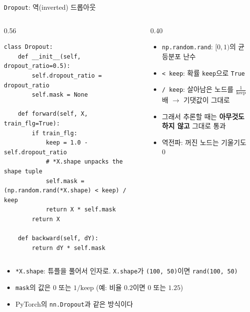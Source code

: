 \documentclass[aspectratio=169,11pt]{beamer}
\newcommand{\codesmall}{\ttfamily\fontsize{7.4}{8.3}\selectfont}
\newcommand{\code}[1]{\texttt{#1}}
\begin{document}
\begin{frame}[fragile]{\code{Dropout}: 역(inverted) 드롭아웃}
\begin{columns}[T,onlytextwidth]
\begin{column}{0.56\textwidth}
\begin{lstlisting}[basicstyle=\codesmall]
class Dropout:
    def __init__(self, dropout_ratio=0.5):
        self.dropout_ratio = dropout_ratio
        self.mask = None

    def forward(self, X, train_flg=True):
        if train_flg:
            keep = 1.0 - self.dropout_ratio
            # *X.shape unpacks the shape tuple
            self.mask = (np.random.rand(*X.shape) < keep) / keep
            return X * self.mask
        return X

    def backward(self, dY):
        return dY * self.mask
\end{lstlisting}
\end{column}
\begin{column}{0.40\textwidth}
\small
\begin{itemize}
\item \code{np.random.rand}: $[0,1)$의 균등분포 난수
\item \code{< keep}: 확률 \code{keep}으로 \code{True}
\item \code{/ keep}: 살아남은 노드를 $\frac{1}{\text{keep}}$배 $\to$ 기댓값이 그대로
\item 그래서 추론할 때는 \textbf{아무것도 하지 않고} 그대로 통과
\item 역전파: 꺼진 노드는 기울기도 $0$
\end{itemize}
\end{column}
\end{columns}
\small
\begin{itemize}
\item \code{*X.shape}: 튜플을 풀어서 인자로. \code{X.shape}가 \code{(100, 50)}이면 \code{rand(100, 50)}
\item \code{mask}의 값은 $0$ 또는 $1/\text{keep}$ (예: 비율 $0.2$이면 $0$ 또는 $1.25$)
\item PyTorch의 \code{nn.Dropout}과 같은 방식이다
\end{itemize}
\end{frame}
\end{document}
